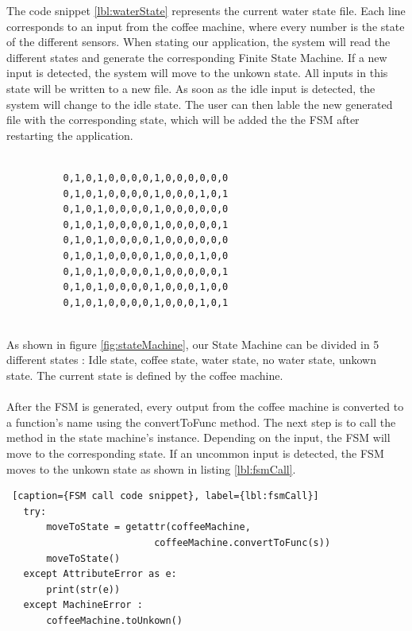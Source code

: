 \documentclass[12pt]{article}
\begin{document}
  The code snippet \ref{lbl:waterState} represents the current water state file. Each line corresponds to an input from the coffee machine, where every number is the state of the different sensors.
  When stating our application, the system will read the different states and generate the corresponding Finite State Machine. 
  If a new input is detected, the system will move to the unkown state.
  All inputs in this state will be written to a new file. As soon as the idle input is detected, the system will change to the idle state. 
  The user can then lable the new generated file with the corresponding state, which will be added the the FSM after restarting the application.\\
  \newpage
   \begin{lstlisting}[caption={Sample of the water state file}, label={lbl:waterState}]
   
		  0,1,0,1,0,0,0,0,1,0,0,0,0,0,0
		  0,1,0,1,0,0,0,0,1,0,0,0,1,0,1
		  0,1,0,1,0,0,0,0,1,0,0,0,0,0,0
		  0,1,0,1,0,0,0,0,1,0,0,0,0,0,1
		  0,1,0,1,0,0,0,0,1,0,0,0,0,0,0
		  0,1,0,1,0,0,0,0,1,0,0,0,1,0,0
		  0,1,0,1,0,0,0,0,1,0,0,0,0,0,1
		  0,1,0,1,0,0,0,0,1,0,0,0,1,0,0
		  0,1,0,1,0,0,0,0,1,0,0,0,1,0,1
		  
  \end{lstlisting}
   As shown in figure \ref{fig:stateMachine}, our State Machine can be divided in 5 different states : Idle state, coffee state, water state, no water state, unkown state.
  The current state is defined by the coffee machine. \\~\\
  After the FSM is generated, every output from the coffee machine is converted to a function's name using the convertToFunc method. 
  The next step is to call the method in the state machine's instance. Depending on the input, the FSM will move to the corresponding state.
  If an uncommon input is detected, the FSM moves to the unkown state as shown in listing \ref{lbl:fsmCall}.\\
   \begin{lstlisting} [caption={FSM call code snippet}, label={lbl:fsmCall}]
   try:
       moveToState = getattr(coffeeMachine, 
                          coffeeMachine.convertToFunc(s))
       moveToState()
   except AttributeError as e:
       print(str(e))
   except MachineError :
       coffeeMachine.toUnkown()
  \end{lstlisting}
  
\end{document}
